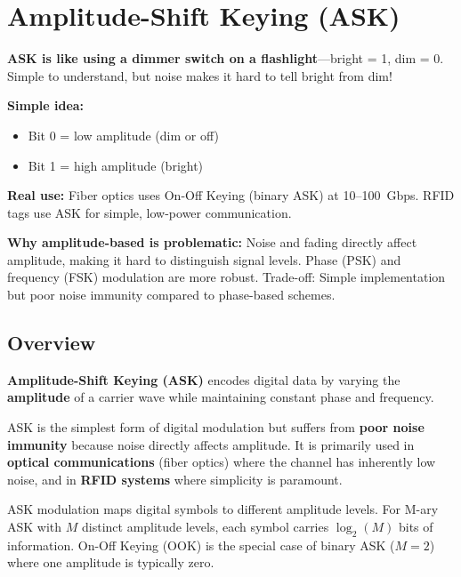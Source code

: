 \chapter{Amplitude-Shift Keying (ASK)}
\label{ch:ask}

\begin{nontechnical}
\textbf{ASK is like using a dimmer switch on a flashlight}---bright = 1, dim = 0. Simple to understand, but noise makes it hard to tell bright from dim!


\textbf{Simple idea:}
\begin{itemize}
\item Bit 0 = low amplitude (dim or off)
\item Bit 1 = high amplitude (bright)
\end{itemize}

\textbf{Real use:} Fiber optics uses On-Off Keying (binary ASK) at 10--100~Gbps. RFID tags use ASK for simple, low-power communication.

\textbf{Why amplitude-based is problematic:} Noise and fading directly affect amplitude, making it hard to distinguish signal levels. Phase (PSK) and frequency (FSK) modulation are more robust. Trade-off: Simple implementation but poor noise immunity compared to phase-based schemes.
\end{nontechnical}

\section{Overview}

\textbf{Amplitude-Shift Keying (ASK)} encodes digital data by varying the \textbf{amplitude} of a carrier wave while maintaining constant phase and frequency.

\begin{keyconcept}
ASK is the simplest form of digital modulation but suffers from \textbf{poor noise immunity} because noise directly affects amplitude. It is primarily used in \textbf{optical communications} (fiber optics) where the channel has inherently low noise, and in \textbf{RFID systems} where simplicity is paramount.
\end{keyconcept}

ASK modulation maps digital symbols to different amplitude levels. For M-ary ASK with $M$ distinct amplitude levels, each symbol carries $\log_2(M)$ bits of information. On-Off Keying (OOK) is the special case of binary ASK ($M=2$) where one amplitude is typically zero.

